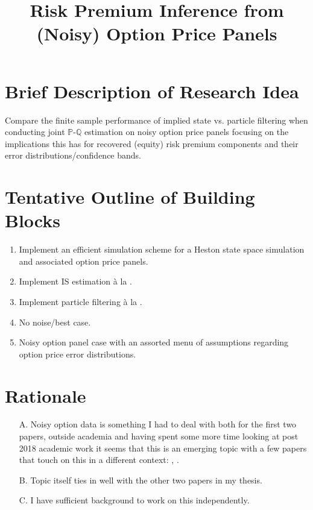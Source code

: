 \documentclass[11pt,a4paper,notitlepage]{article}
\author{ %
	    }
\title{\vspace*{-55pt} Risk Premium Inference from (Noisy) Option Price Panels \vspace*{-35pt}}
\date{\item First version: June 16, 2018 \item Previous Version: July 21, 2026 \item This version: August 6, 2026}
\numberwithin{equation}{section}
\begin{document}
\maketitle

\onehalfspacing

\section*{Brief Description of Research Idea}
Compare the finite sample performance of implied state vs. particle filtering when conducting joint $\mathbb{P}$-$\mathbb{Q}$	estimation on noisy option price panels focusing on the implications this has for recovered (equity) risk premium components and their error distributions/confidence bands. 

\section*{Tentative Outline of Building Blocks}
\begin{enumerate}
\item Implement an efficient simulation scheme for a Heston \citep{heston} state space simulation and associated option price panels.
\item Implement IS estimation \`{a} la \cite{boswijk2015asset}.
\item Implement particle filtering \`{a} la \cite{hurn2015pf}.
\item No noise/best case.
\item Noisy option panel case with an assorted menu of assumptions regarding option price error distributions.
\end{enumerate}

\section*{Rationale}
\begin{enumerate}
\item[A.] Noisy option data is something I had to deal with both for the first two papers, outside academia and having spent some more time looking at post 2018 academic work it seems that this is an emerging topic with a few papers that touch on this in a different context: \cite{andersen2021spatial}, \cite{duarte2024very}.
\item[B.] Topic itself ties in well with the other two papers in my thesis.
\item[C.] I have sufficient background to work on this independently.
\end{enumerate}
\end{document}
